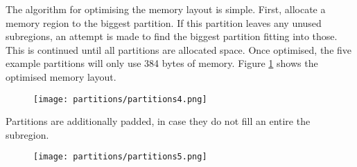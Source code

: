 The algorithm for optimising the memory layout is simple. First, allocate a
memory region to the biggest partition. If this partition leaves any unused
subregions, an attempt is made to find the biggest partition fitting into those.
This is continued until all partitions are allocated space.
Once optimised, the five example partitions will only use 384 bytes of memory.
Figure \ref{fig:ce4} shows the optimised memory layout.

\begin{figure}[H]
\centering
\texttt{[image: partitions/partitions4.png]}
\label{fig:ce4}
\end{figure}

Partitions are additionally padded, in case they do not fill an entire the subregion.\\

\begin{figure}[H]
\centering
\texttt{[image: partitions/partitions5.png]}
\label{fig:ce5}
\end{figure}

